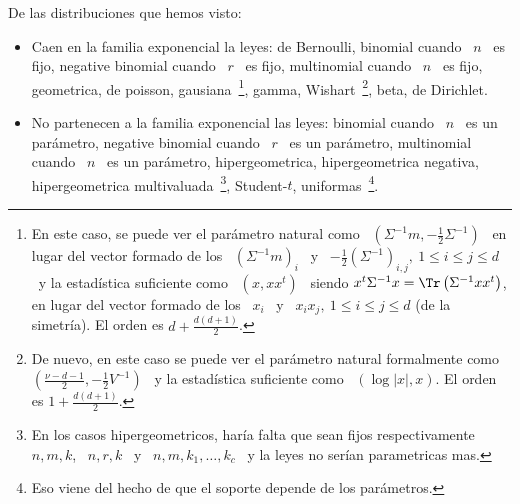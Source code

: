 De las distribuciones que hemos visto:
%
\begin{itemize}
\item Caen en  la familia exponencial la leyes: de  Bernoulli, binomial cuando \
  $n$ \ es fijo, negative binomial cuando  \ $r$ \ es fijo, multinomial cuando \
  $n$ \  es fijo,  geometrica, de poisson,  gausiana~\footnote{En este  caso, se
    puede ver  el par\'ametro  natural como \  $\left( \Sigma^{-1} m  , -\frac12
      \Sigma^{-1}  \right)$ \  en  lugar del  vector  formado de  los \  $\left(
      \Sigma^{-1} m \right)_i$ \ y \ $-\frac12 \left( \Sigma^{-1} \right)_{i,j},
    \: 1 \le i \le j \le d$ \ y la estad\'istica suficiente como \ $\left( x , x
      x^t \right)$  \ siendo  $x^t \Sigma^{-1} x  = \Tr\left( \Sigma^{-1}  x x^t
    \right)$, en lugar  del vector formado de los  \ $x_i$ \ y \ $x_i  x_j, \: 1
    \le  i  \le  j \le  d$  (de  la  simetr\'ia).   El  orden es  $d  +  \frac{d
      (d+1)}{2}$.}, gamma, Wishart~\footnote{De nuevo, en este caso se puede ver
    el  par\'ametro  natural  formalmente  como \  $\left(  \frac{\nu-d-1}{2}  ,
      -\frac12 V^{-1}  \right)$ \ y  la estad\'istica suficiente como  \ $\left(
      \log |x|  , x \right)$.  El orden es  $1 + \frac{d (d+1)}{2}$.},  beta, de
  Dirichlet.
%
%
\item No partenecen a la familia  exponencial las leyes: binomial cuando \ $n$ \
  es  un  par\'ametro, negative  binomial  cuando \  $r$  \  es un  par\'ametro,
  multinomial cuando \ $n$ \ es un par\'ametro, hipergeometrica, hipergeometrica
  negativa,     hipergeometrica      multivaluada~\footnote{En     los     casos
    hipergeometricos, har\'ia falta que sean  fijos respectivamente \ $n, m, k$,
    \ $n,  r, k$  \ y  \ $n,  m, k_1, \ldots  , k_c$  \ y  la leyes  no ser\'ian
    parametricas mas.}, Student-$t$,  uniformas~\footnote{Eso viene del hecho de
    que el soporte depende de los par\'ametros.}.
\end{itemize}

